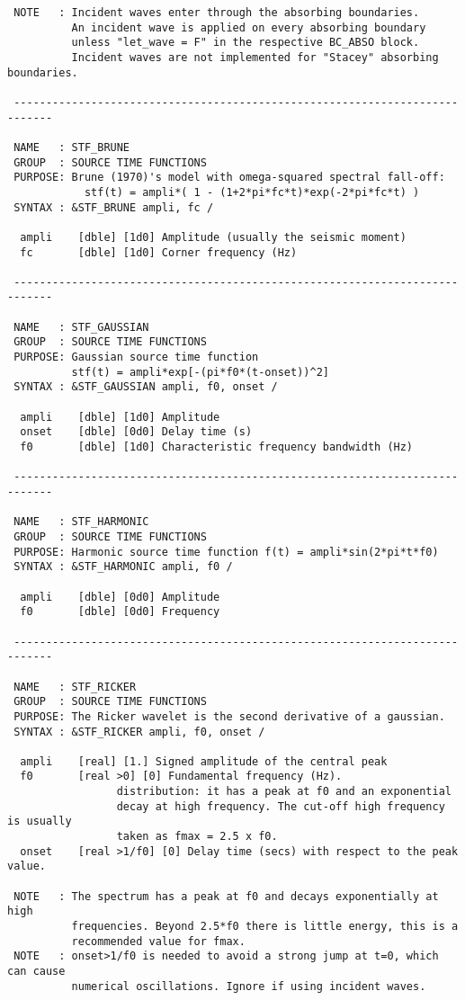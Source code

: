 \begin{verbatim}
 NOTE   : Incident waves enter through the absorbing boundaries.
          An incident wave is applied on every absorbing boundary
          unless "let_wave = F" in the respective BC_ABSO block.
          Incident waves are not implemented for "Stacey" absorbing boundaries.

 ----------------------------------------------------------------------------

 NAME   : STF_BRUNE
 GROUP  : SOURCE TIME FUNCTIONS
 PURPOSE: Brune (1970)'s model with omega-squared spectral fall-off:
            stf(t) = ampli*( 1 - (1+2*pi*fc*t)*exp(-2*pi*fc*t) )
 SYNTAX : &STF_BRUNE ampli, fc /

  ampli    [dble] [1d0] Amplitude (usually the seismic moment)
  fc       [dble] [1d0] Corner frequency (Hz)

 ----------------------------------------------------------------------------

 NAME   : STF_GAUSSIAN
 GROUP  : SOURCE TIME FUNCTIONS
 PURPOSE: Gaussian source time function  
          stf(t) = ampli*exp[-(pi*f0*(t-onset))^2]
 SYNTAX : &STF_GAUSSIAN ampli, f0, onset /

  ampli    [dble] [1d0] Amplitude
  onset    [dble] [0d0] Delay time (s)
  f0       [dble] [1d0] Characteristic frequency bandwidth (Hz)  

 ----------------------------------------------------------------------------

 NAME   : STF_HARMONIC
 GROUP  : SOURCE TIME FUNCTIONS
 PURPOSE: Harmonic source time function f(t) = ampli*sin(2*pi*t*f0)
 SYNTAX : &STF_HARMONIC ampli, f0 /

  ampli    [dble] [0d0] Amplitude
  f0       [dble] [0d0] Frequency

 ----------------------------------------------------------------------------

 NAME   : STF_RICKER
 GROUP  : SOURCE TIME FUNCTIONS
 PURPOSE: The Ricker wavelet is the second derivative of a gaussian.
 SYNTAX : &STF_RICKER ampli, f0, onset /

  ampli    [real] [1.] Signed amplitude of the central peak
  f0       [real >0] [0] Fundamental frequency (Hz).
                 distribution: it has a peak at f0 and an exponential
                 decay at high frequency. The cut-off high frequency is usually
                 taken as fmax = 2.5 x f0. 
  onset    [real >1/f0] [0] Delay time (secs) with respect to the peak value. 

 NOTE   : The spectrum has a peak at f0 and decays exponentially at high 
          frequencies. Beyond 2.5*f0 there is little energy, this is a 
          recommended value for fmax.
 NOTE   : onset>1/f0 is needed to avoid a strong jump at t=0, which can cause
          numerical oscillations. Ignore if using incident waves.


\end{verbatim}
